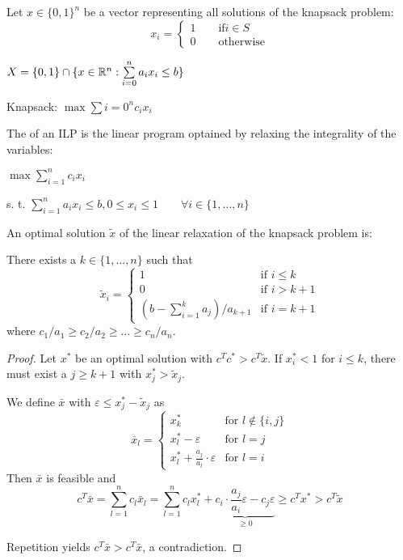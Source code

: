 Let $x \in \{0,1\}^n$ be a vector representing all solutions of the knapsack problem:
\[
	x_i = \begin{cases}
		1 \qquad \text{if} i \in S \\
		0 \qquad \text{otherwise}
	\end{cases}
\]

$X = \{0,1\} \cap \{ x \in \mathbb{R}^n: \sum\limits_{i = 0}^n a_ix_i\leq b\}$

Knapsack: $\max \sum{i = 0}^n c_i x_i$

The  of an ILP is the linear program optained by relaxing the integrality of the variables:

$\max \sum_{i=1}^n c_i x_i$

s. t. $\sum_{i=1}^n a_i x_i \leq b, 0 \leq x_i \leq 1 \qquad \forall i \in \{1, …, n\}$

\begin{thm}
An optimal solution $\tilde{x}$ of the linear relaxation of the knapsack
problem is:

There exists a $k \in \{1, …, n\}$ such that 
\[
\tilde{x}_i = \left \{ \begin{array}{ll}
1 & \text{if } i \leq k \\ 
0 & \text{if } i > k+1 \\
(b-\sum^k_{i=1} a_j) / a_{k+1} & \text{if } i=k+1
\end{array} \right.
\]
where $c_1/a_1 \geq c_2 / a_2 \geq … \geq c_n / a_n$.
\end{thm}

\begin{proof}
Let $x^*$ be an optimal solution with $c^T c^* > c^T \tilde{x}$.
If $x^*_i < 1$ for $i \leq k$, there must exist a $j \geq k+1$ with $x^*_j >
\tilde{x}_j$.

We define $\bar{x}$ with $\varepsilon \leq x^*_j - \tilde{x}_j$ as
\[
\bar{x}_l = \left \{ \begin{array}{ll}
x^*_k & \text{for } l \not\in \{i, j\} \\
x^*_l - \varepsilon & \text{for } l=j \\
x^*_l + \frac{a_j}{a_l} \cdot \varepsilon & \text{for } l=i
\end{array} \right.
\]
Then $\bar{x}$ is feasible and
\[
c^T \bar{x} = \sum_{l=1}^n c_l \bar{x}_l =
\sum_{l=1}^n c_l x^*_l + \underbrace{c_i \cdot \frac{a_j}{a_i} \varepsilon - c_j
\varepsilon}_{\geq 0} \geq c^T x^* > c^T \tilde{x}
\]

Repetition yields $c^T \bar{x} > c^T \bar{x}$, a contradiction.
\end{proof}

